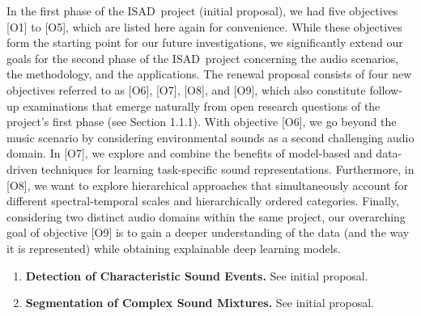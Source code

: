 \documentclass[11pt,a4paper]{article}
\def\PN{\mathrm{ISAD}}
\theoremstyle{plain} \newtheorem{define}{Definition}[section]
\begin{document}
{In the first phase of the $\PN$~project (initial proposal), we had five objectives [O1] to [O5], which are listed here again for convenience. While these objectives form the starting point for our future investigations, we significantly extend our goals for the second phase of the $\PN$~project concerning the audio scenarios, the methodology, and the applications. The renewal proposal consists of four new objectives referred to as [O6], [O7], [O8], and [O9], which also constitute follow-up examinations that emerge naturally from open research questions of the project's first phase (see Section 1.1.1).
%
With objective [O6], we go beyond the music scenario by considering environmental sounds as a second challenging audio domain. 
%
In [O7], we explore and combine the benefits of model-based and data-driven techniques for learning task-specific sound representations.
%
Furthermore, in [O8], we want to explore hierarchical approaches that simultaneously account for different spectral-temporal scales and hierarchically ordered categories.
%
%
Finally, considering two distinct audio domains within the same project, our overarching goal of objective [O9] is to gain a deeper understanding of the data (and the way it is represented) while obtaining explainable deep learning models.

\renewcommand{\labelenumi}{[O\arabic{enumi}]}
\begin{enumerate}
\setcounter{enumi}{0}

\item \label{objective:detection}
\textbf{Detection of Characteristic Sound Events.}
%
See initial proposal.

\item \label{objective:segmentation}
\textbf{Segmentation of Complex Sound Mixtures.}
%
See initial proposal.


\end{enumerate}}
\end{document}
